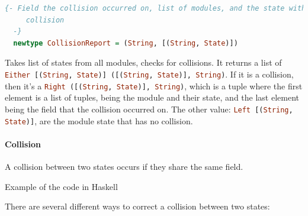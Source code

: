 \begin{lstlisting}[language=Haskell]
  {- Field the collision occurred on, list of modules, and the state with the
     collision
  -}
  newtype CollisionReport = (String, [(String, State)])
\end{lstlisting}

Takes list of states from all modules, checks for collisions. It returns a
list of \lstinline[language=Haskell]{Either [(String, State)] ([(String, State)], String)}. If it is a
collision, then it's a \lstinline[language=Haskell]{Right ([(String, State)], String)}, which is a tuple
where the first element is a list of tuples, being the module and their
state, and the last element being the field that the collision occurred on.
The other value: \lstinline[language=Haskell]{Left [(String, State)]}, are the module state that has no
collision.

\paragraph{Collision} A collision between two states occurs if they share the same
field.

Example of the code in Haskell

\begin{center}
  
\end{center}

There are several different ways to correct a collision between two
states:

